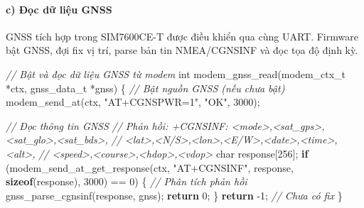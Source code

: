 \documentclass[13pt,a4paper]{extarticle}
\newenvironment{Shaded}{}{}
\newcommand{\CommentTok}[1]{\textcolor[rgb]{0.38,0.63,0.69}{\textit{#1}}}
\newcommand{\ControlFlowTok}[1]{\textcolor[rgb]{0.00,0.44,0.13}{\textbf{#1}}}
\newcommand{\DataTypeTok}[1]{\textcolor[rgb]{0.56,0.13,0.00}{#1}}
\newcommand{\DecValTok}[1]{\textcolor[rgb]{0.25,0.63,0.44}{#1}}
\newcommand{\KeywordTok}[1]{\textcolor[rgb]{0.00,0.44,0.13}{\textbf{#1}}}
\newcommand{\NormalTok}[1]{#1}
\newcommand{\OperatorTok}[1]{\textcolor[rgb]{0.40,0.40,0.40}{#1}}
\newcommand{\StringTok}[1]{\textcolor[rgb]{0.25,0.44,0.63}{#1}}
\renewcommand{\\}{\thesislongtableorignewline\hline}%
\begin{document}
\paragraph{c) Đọc dữ liệu
GNSS}\label{c-ux111ux1ecdc-dux1eef-liux1ec7u-gnss}

GNSS tích hợp trong SIM7600CE-T được điều khiển qua cùng UART. Firmware
bật GNSS, đợi fix vị trí, parse bản tin NMEA/CGNSINF và đọc tọa độ định
kỳ.

\begin{Shaded}
\begin{Highlighting}[]
\CommentTok{// Bật và đọc dữ liệu GNSS từ modem}
\DataTypeTok{int}\NormalTok{ modem\_gnss\_read}\OperatorTok{(}\NormalTok{modem\_ctx\_t }\OperatorTok{*}\NormalTok{ctx}\OperatorTok{,}\NormalTok{ gnss\_data\_t }\OperatorTok{*}\NormalTok{gnss}\OperatorTok{)}
\OperatorTok{\{}
    \CommentTok{// Bật nguồn GNSS (nếu chưa bật)}
\NormalTok{    modem\_send\_at}\OperatorTok{(}\NormalTok{ctx}\OperatorTok{,} \StringTok{"AT+CGNSPWR=1"}\OperatorTok{,} \StringTok{"OK"}\OperatorTok{,} \DecValTok{3000}\OperatorTok{);}

    \CommentTok{// Đọc thông tin GNSS}
    \CommentTok{// Phản hồi: +CGNSINF: \textless{}mode\textgreater{},\textless{}sat\_gps\textgreater{},\textless{}sat\_glo\textgreater{},\textless{}sat\_bds\textgreater{},}
    \CommentTok{//           \textless{}lat\textgreater{},\textless{}N/S\textgreater{},\textless{}lon\textgreater{},\textless{}E/W\textgreater{},\textless{}date\textgreater{},\textless{}time\textgreater{},\textless{}alt\textgreater{},}
    \CommentTok{//           \textless{}speed\textgreater{},\textless{}course\textgreater{},\textless{}hdop\textgreater{},\textless{}vdop\textgreater{}}
    \DataTypeTok{char}\NormalTok{ response}\OperatorTok{[}\DecValTok{256}\OperatorTok{];}
    \ControlFlowTok{if} \OperatorTok{(}\NormalTok{modem\_send\_at\_get\_response}\OperatorTok{(}\NormalTok{ctx}\OperatorTok{,} \StringTok{"AT+CGNSINF"}\OperatorTok{,}
\NormalTok{                                    response}\OperatorTok{,} \KeywordTok{sizeof}\OperatorTok{(}\NormalTok{response}\OperatorTok{),}
                                    \DecValTok{3000}\OperatorTok{)} \OperatorTok{==} \DecValTok{0}\OperatorTok{)} \OperatorTok{\{}
        \CommentTok{// Phân tích phản hồi}
\NormalTok{        gnss\_parse\_cgnsinf}\OperatorTok{(}\NormalTok{response}\OperatorTok{,}\NormalTok{ gnss}\OperatorTok{);}
        \ControlFlowTok{return} \DecValTok{0}\OperatorTok{;}
    \OperatorTok{\}}
    \ControlFlowTok{return} \OperatorTok{{-}}\DecValTok{1}\OperatorTok{;}  \CommentTok{// Chưa có fix}
\OperatorTok{\}}


\end{Highlighting}
\end{Shaded}
\end{document}
